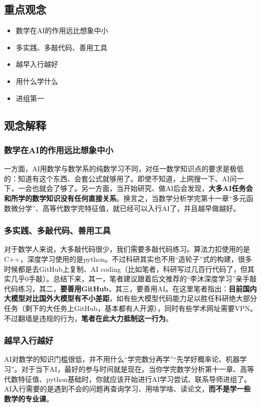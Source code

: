 \documentclass[12pt, a4paper, fontset=ubuntu]{ctexart}
\begin{document}
\subsection{重点观念}
\begin{itemize}
    \item 数学在AI的作用远比想象中小
    \item 多实践、多敲代码、善用工具
    \item 越早入行越好
    \item 用什么学什么
    \item 进组第一
\end{itemize}

\subsection{观念解释}
\subsubsection{数学在AI的作用远比想象中小} 
一方面，AI用数学与数学系的纯数学习不同，对任一数学知识点的要求是极低的：知道有这个东西、会套公式就够用了。即使不知道，上网搜一下、AI问一下，一会也就会了够了。另一方面，当开始研究、做AI后会发现，\textbf{大多AI任务会和所学的数学知识没有任何直接关系}。换言之，当数学分析学完第十一章“多元函数微分学”、高等代数学完特征值，就已经可以入行AI了，并且越早做越好。
\subsubsection{多实践、多敲代码、善用工具}
对于数学人来说，大多敲代码很少，我们需要多敲代码练习。算法力扣使用的是C++，深度学习使用的是python。不过科研其实也不用“造轮子”式的构建，很多时候都是去GitHub上复制、AI coding（比如笔者，科研写过几百行代码了，但其实几乎0手敲）。总结下来，其一，笔者建议跟着后文推荐的“李沐深度学习”亲手敲代码练习，其二，\textbf{要善用GitHub}，其三，要善用AI。在这里笔者指出：\textbf{目前国内大模型对比国外大模型有不小差距}，如有些大模型代码能力足以胜任科研绝大部分任务（剩下的大任务上GitHub，基本都有人开源），同时有些学术网址需要VPN。不过翻墙是违规的行为，\textbf{笔者在此大力抵制这一行为}。
\subsubsection{越早入行越好}
AI对数学的知识门槛很低，并不用什么“学完数分再学”“先学好概率论、机器学习”。对于当下AI，最好的参与时间就是现在。当你学完数学分析第十一章、高等代数特征值、python基础时，你就应该开始进行AI学习尝试、联系导师进组了。AI入行需要的是遇到不会的问题再查询学习、用啥学啥、读论文，\textbf{而不是学一些数学的专业课}。
\end{document}
